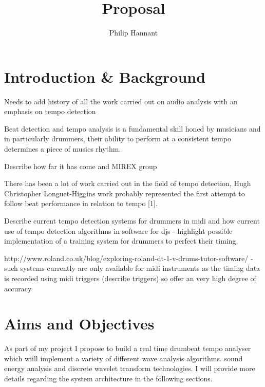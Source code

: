\documentclass{article} \title{Proposal} \author{Philip Hannant}
\begin{document}
 \maketitle{} \section{Introduction \& Background}

Needs to add history of all the work carried out on audio analysis with an emphasis on tempo detection

Beat detection and tempo analysis is a fundamental skill honed by musicians and in particularly drummers, their ability to perform at a consistent tempo determines a piece of musics rhythm. 

Describe how far it has come and MIREX group

There has been a lot of work carried out in the field of tempo detection, Hugh Christopher Longuet-Higgins work probably represented the first attempt to follow beat performance in relation to tempo [1]. 

Describe current tempo detection systems for drummers in midi and how current use of tempo detection algorithms in software for djs - highlight possible implementation of a training system for drummers to perfect their timing.

http://www.roland.co.uk/blog/exploring-roland-dt-1-v-drums-tutor-software/ - such systems currently are only available for midi instruments as the timing data is recorded using midi triggers (describe triggers) so offer an very high degree of accuracy

\subsection{}

\maketitle{} \section{Aims and Objectives}
As part of my project I propose to build a real time drumbeat tempo analyser which wiill implement a variety of different wave analysis algorithms. sound energy analysis and discrete wavelet transform technologies. I will provide more details regarding the system architecture in the following sections. 
\end{document}
